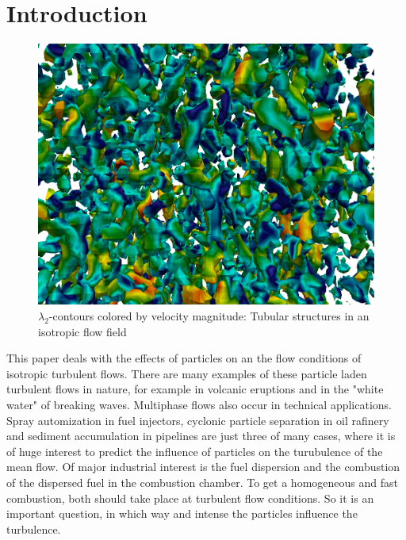 \documentclass[11pt,a4paper,openany,oneside,parskip=half*]{article}
\begin{document}
\section{Introduction}
\begin{figure}[h]
	\centering
  \includegraphics[width=\textwidth]{./Abbildungen/64_velocity.png}
	\caption{$\lambda_\mathrm{2}$-contours colored by velocity magnitude: Tubular structures in an isotropic flow field}
	\label{introuction_picture}
\end{figure}
This paper deals with the effects of particles on an the flow conditions of isotropic turbulent flows.
There are many examples of these particle laden turbulent flows in nature, for example in volcanic eruptions and in the "white water" of breaking waves.
\newline
Multiphase flows also occur in technical applications. Spray automization in fuel injectors, cyclonic particle separation in oil rafinery and sediment accumulation in pipelines are just three of many cases, where it is of huge interest to predict the influence of particles on the turubulence of the mean flow.
Of major industrial interest is the fuel dispersion and the combustion of the dispersed fuel in the combustion chamber. To get a homogeneous and fast combustion, both should take place at turbulent flow conditions. So it is an important question, in which way and intense the particles influence the turbulence.
\newline
\end{document}
